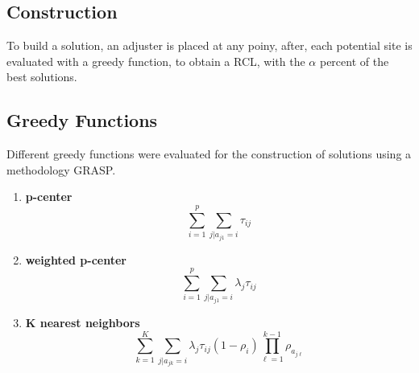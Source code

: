 
\subsection{Construction}
\begin{frame}
  To build a solution, an adjuster is placed at any poiny, after,
  each potential site is evaluated with a greedy function, to obtain a RCL,
  with the $\alpha$ percent of the best solutions.
\end{frame}


\subsection{Greedy Functions}
\begin{frame}
  Different greedy functions were evaluated for the construction of solutions using a methodology GRASP.
  \begin{enumerate}
  \item \textbf{p-center} 
    \begin{equation}
      \sum_{i=1}^{p}{\sum_{j|a_{j1}=i}{\tau_{ij}}}
    \end{equation}
  \item \textbf{weighted p-center} 
    \begin{equation}
      \sum_{i=1}^{p}{\sum_{j|a_{j1}=i}{\lambda_{j}\tau_{ij}}}
    \end{equation}
  \item \textbf{K nearest neighbors}
    \begin{equation}
      \sum_{k=1}^K{\sum_{j|a_{jk}=i}{\lambda_{j}\tau_{ij}(1-\rho_i)\prod_{\ell=1}^{k-1}{\rho_{a_{j\ell}}}}}
    \end{equation}
  \end{enumerate}
\end{frame}

